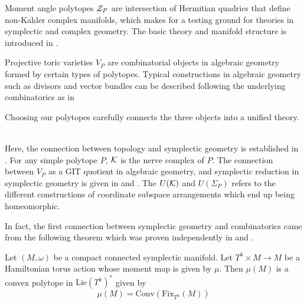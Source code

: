 \documentclass[a4paper]{article}
\begin{document}
Moment angle polytopes $\mathcal{Z}_P$ are intersection of Hermitian quadrics that define non-Kahler complex manifolds, which makes for a testing ground for theories in symplectic and complex geometry. The basic theory and manifold structure is introduced in \cite{ToricTopology}. 

Projective toric varieties $V_P$ are combinatorial objects in algebraic geometry formed by certain types of polytopes. Typical constructions in algebraic geometry such as divisors and vector bundles can be described following the underlying combinatorics as in \cite{ToricVarieties}

Choosing our polytopes carefully connects the three objects into a unified theory. 

 \\

Here, the connection between topology and symplectic geometry is established in \cite{ToricTopology}. For any simple polytope $P$, $\mathcal{K}$ is the nerve complex of $P$. The connection between $V_P$ as a GIT quotient in algebraic geometry, and symplectic reduction in symplectic geometry is given in \cite{ToricTopology} and \cite{ToricVarieties}. The $U(\mathcal{K})$ and $U(\Sigma_P)$ refers to the different constructions of coordinate subspace arrangements which end up being homeomorphic. 

In fact, the first connection between symplectic geometry and combinatorics came from the following theorem which was proven independently in \cite{Atiyah} and \cite{Guillemin}. 

\begin{thm}
Let $(M,\omega)$ be a compact connected symplectic manifold. Let $T^k\times M\to M$ be a Hamiltonian torus action whose moment map is given by $\mu$. Then $\mu(M)$ is a convex polytope in $\text{Lie}(T^k)^\ast$ given by $$\mu(M)=\text{Conv}(\text{Fix}_{T^k}(M))$$
\end{thm}
\end{document}
